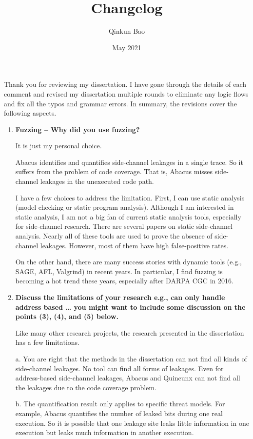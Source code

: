 \documentclass{article}
\title{Changelog}
\author{Qinkun Bao}
\date{May 2021}
\begin{document}
\maketitle
Thank you for reviewing my dissertation. I have gone through the details of each comment and revised my dissertation multiple rounds to eliminate any logic flows and fix all the typos and grammar errors. In summary, the revisions cover the following aspects.


\begin{enumerate}
\item \textbf{Fuzzing – Why did you use fuzzing?}

It is just my personal choice.

Abacus identifies and quantifies side-channel leakages in a single trace. So it suffers from the problem of code coverage.  That is, Abacus misses side-channel leakages in the unexecuted code path. 

I have a few choices to address the limitation. First, I can use static analysis (model checking or static program analysis). Although I am interested in static analysis, I am not a big fan of current static analysis tools, especially for side-channel research. There are several papers on static side-channel analysis. Nearly all of these tools are used to prove the absence of side-channel leakages. However, most of them have high false-positive rates. 

On the other hand, there are many success stories with dynamic tools (e.g., SAGE, AFL, Valgrind) in recent years. In particular, I find fuzzing is becoming a hot trend these years, especially after DARPA CGC in 2016.

\item \textbf{Discuss the limitations of your research
e.g., can only handle address based …
you might want to include some discussion on the points (3), (4), and (5) below.}

Like many other research projects, the research presented in the dissertation has a few limitations.

a. You are right that the methods in the dissertation can not find all kinds of side-channel leakages. No tool can find all forms of leakages. Even for address-based side-channel leakages, Abacus and Quincunx can not find all the leakages due to the code coverage problem. 

b. The quantification result only applies to specific threat models. For example, Abacus quantifies the number of leaked bits during one real execution. So it is possible that one leakage site leaks little information in one execution but leaks much information in another execution.


\end{enumerate}
\end{document}
